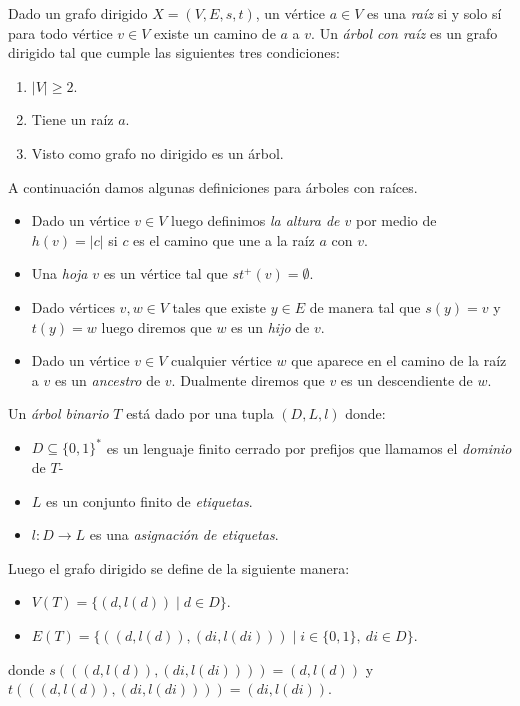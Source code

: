 \documentclass[tesis.tex]{subfiles}
\begin{document}
\begin{leoenv}
\begin{deff}
	Dado un grafo dirigido $X = (V,E,s,t)$, un vértice $a \in V$ es una \emph{raíz} si y solo sí para todo vértice $v \in V$ existe un camino de $a$ a $v$.
	Un \emph{árbol con raíz} es un grafo dirigido tal que cumple las siguientes tres condiciones:
	\begin{enumerate}
		\item $|V| \ge 2$.
		\item Tiene un raíz $a$.
		\item Visto como grafo no dirigido es un árbol.
	\end{enumerate}
	A continuación damos algunas definiciones para árboles con raíces.
	\begin{itemize}
		\item Dado un vértice $v \in V$ luego definimos \emph{la altura de $v$} por medio de 
		$h(v) = |c|$ si $c$ es el camino que une a la raíz $a$ con $v$.

		\item Una \emph{hoja} $v$ es un vértice tal que $st^{+}(v) = \emptyset$.
		
		\item Dado vértices $v,w \in V$ tales que existe $y \in E$ de manera tal que 
		$s(y) = v$ y $t(y) = w$ luego diremos que $w$ es un \emph{hijo} de $v$.

		\item Dado un vértice $v \in V$ cualquier vértice $w$ que aparece en el camino de la raíz a $v$ es un \emph{ancestro} de $v$. 
		Dualmente diremos que $v$ es un descendiente de $w$.

	\end{itemize}
\end{deff}


\begin{deff}
	Un \emph{árbol binario} $T$ está dado por una tupla $(D,L,l)$ donde:
	\begin{itemize}
		\item $D \subseteq \{0,1\}^{*}$ es un lenguaje finito cerrado por prefijos que llamamos el \emph{dominio} de $T$-
		\item $L$ es un conjunto finito de \emph{etiquetas}.
		\item $l:D \to L$ es una \emph{asignación de etiquetas}.
	\end{itemize}
	Luego el grafo dirigido se define de la siguiente manera:
	\begin{itemize}
		\item $V(T) = \{(d,l(d)) \mid d \in D \}$.
		\item $E(T) = \{ ((d,l(d)),(di,l(di))) \mid i \in \{0,1\}, \ di \in D \}$.
	\end{itemize}
	donde $s(((d,l(d)),(di,l(di)))) = (d,l(d))$ y $t(((d,l(d)),(di,l(di)))) = (di,l(di))$.
\end{deff}


\end{leoenv}
\end{document}
